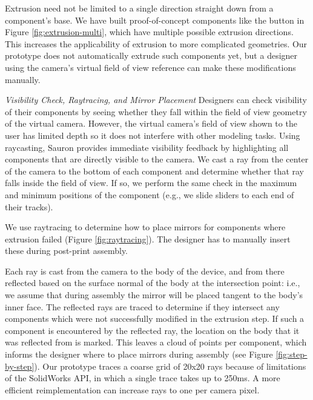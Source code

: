 Extrusion need not be limited to a single direction straight down from a component's base. We have built proof-of-concept components like the button in Figure \ref{fig:extrusion-multi}, which have multiple possible extrusion directions. This increases the applicability of extrusion to more complicated geometries. Our prototype does not automatically extrude such components yet, but a designer using the camera's virtual field of view reference can make these modifications manually.


\emph{Visibility Check, Raytracing, and Mirror Placement}
Designers can check visibility of their components by seeing whether they fall within the field of view geometry of the virtual camera. However, the virtual camera's field of view shown to the user has limited depth so it does not interfere with other modeling tasks. Using raycasting, Sauron  provides immediate visibility feedback by highlighting all components that are directly visible to the camera. We cast a ray from the center of the camera to the bottom of each component and determine whether that ray falls inside the field of view. If so, we perform the same check in the maximum and minimum positions of the component (e.g., we slide sliders to each end of their tracks). %

We use raytracing to determine how to place mirrors for components where extrusion failed (Figure \ref{fig:raytracing}). The designer has to manually insert these during post-print assembly. %

Each ray is cast from the camera to the body of the device, and from there reflected  based on the surface normal of the body at the intersection point: i.e., we assume that during assembly the mirror will be placed tangent to the body's inner face. The reflected rays are traced to determine if they intersect any components which were not successfully modified in the extrusion step. If such a component is encountered by the reflected ray, the location on the body that it was reflected from is marked. This leaves a cloud of points per component, which informs the designer where to place mirrors during assembly (see Figure \ref{fig:step-by-step}). Our prototype traces a coarse grid of 
20x20 rays because of limitations of the SolidWorks API, in which a single trace takes up to 250ms. A more efficient reimplementation can increase rays to one per camera pixel.


